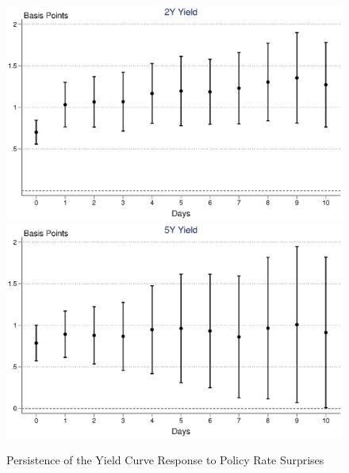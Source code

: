 \documentclass[a4paper,12pt]{article} 		%
\begin{document}
\clearpage
\renewcommand\thefigure{\ref{sec:yieldcurve}\arabic{figure}}
\setcounter{figure}{0}
\begin{figure}[tbph]
	\caption{Persistence of the Yield Curve Response to Policy Rate Surprises} \label{fig:persistprsyc}
	\begin{center}								%
		\begin{minipage}{0.9\linewidth}
			\begin{center}							%
				\label{fig:persistprsyc}
				\includegraphics[trim={0.5cm 0cm 0.5cm 0cm},clip,height=.2\textheight,width=1\textwidth]{../Figures/persistprsgmxn02yr.eps} \\
				\includegraphics[trim={0.5cm 0cm 0.5cm 0cm},clip,height=.2\textheight,width=1\textwidth]{../Figures/persistprsgmxn05yr.eps} \\

\end{center}
\end{minipage}
\end{center}
\end{figure}
\end{document}
